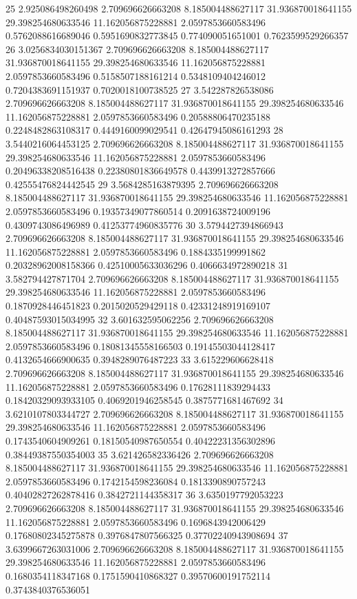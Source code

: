 {25 2.925086498260498 2.709696626663208 8.185004488627117 31.936870018641155 29.398254680633546 11.162056875228881 2.0597853660583496 0.5762088616689046 0.5951690832773845 0.774090051651001 0.7623599529266357
26 3.0256834030151367 2.709696626663208 8.185004488627117 31.936870018641155 29.398254680633546 11.162056875228881 2.0597853660583496 0.5158507188161214 0.5348109404246012 0.7204383691151937 0.7020018100738525
27 3.542287826538086 2.709696626663208 8.185004488627117 31.936870018641155 29.398254680633546 11.162056875228881 2.0597853660583496 0.20588806470235188 0.2248482863108317 0.4449160099029541 0.42647945086161293
28 3.5440216064453125 2.709696626663208 8.185004488627117 31.936870018641155 29.398254680633546 11.162056875228881 2.0597853660583496 0.20496338208516438 0.22380801836649578 0.4439913272857666 0.42555476824442545
29 3.5684285163879395 2.709696626663208 8.185004488627117 31.936870018641155 29.398254680633546 11.162056875228881 2.0597853660583496 0.19357349077860514 0.2091638724009196 0.4309743086496989 0.41253774960835776
30 3.5794427394866943 2.709696626663208 8.185004488627117 31.936870018641155 29.398254680633546 11.162056875228881 2.0597853660583496 0.1884335199991862 0.20328962008158366 0.42510005633036296 0.4066634972890218
31 3.582794427871704 2.709696626663208 8.185004488627117 31.936870018641155 29.398254680633546 11.162056875228881 2.0597853660583496 0.1870928446451823 0.2015020529429118 0.42331248919169107 0.40487593015034995
32 3.601632595062256 2.709696626663208 8.185004488627117 31.936870018641155 29.398254680633546 11.162056875228881 2.0597853660583496 0.18081345558166503 0.19145503044128417 0.4132654666900635 0.3948289076487223
33 3.615229606628418 2.709696626663208 8.185004488627117 31.936870018641155 29.398254680633546 11.162056875228881 2.0597853660583496 0.17628111839294433 0.18420329093933105 0.4069201946258545 0.3875771681467692
34 3.6210107803344727 2.709696626663208 8.185004488627117 31.936870018641155 29.398254680633546 11.162056875228881 2.0597853660583496 0.1743540604909261 0.18150540987650554 0.40422231356302896 0.38449387550354003
35 3.621426582336426 2.709696626663208 8.185004488627117 31.936870018641155 29.398254680633546 11.162056875228881 2.0597853660583496 0.1742154598236084 0.1813390890757243 0.40402827262878416 0.3842721144358317
36 3.6350197792053223 2.709696626663208 8.185004488627117 31.936870018641155 29.398254680633546 11.162056875228881 2.0597853660583496 0.1696843942006429 0.17680802345275878 0.3976847807566325 0.37702240943908694
37 3.6399667263031006 2.709696626663208 8.185004488627117 31.936870018641155 29.398254680633546 11.162056875228881 2.0597853660583496 0.1680354118347168 0.1751590410868327 0.39570600191752114 0.3743840376536051
}
